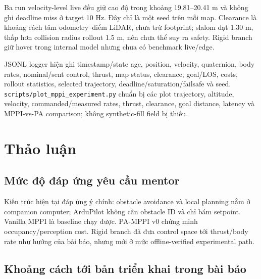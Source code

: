 \documentclass[11pt,a4paper]{article}
\newcommand{\code}[1]{\texttt{#1}}
\begin{document}
Ba run velocity-level live đều giữ cao độ trong khoảng 19.81--20.41 m và không
ghi deadline miss ở target 10 Hz. Đây chỉ là một seed trên mỗi map. Clearance
là khoảng cách tâm odometry--điểm LiDAR, chưa trừ footprint; slalom đạt 1.30 m,
thấp hơn collision radius rollout 1.5 m, nên chưa thể suy ra safety. Rigid
branch giữ hover trong internal model nhưng chưa có benchmark live/edge.

JSONL logger hiện ghi timestamp/state age, position, velocity, quaternion, body
rates, nominal/sent control, thrust, map status, clearance, goal/LOS, costs,
rollout statistics, selected trajectory, deadline/saturation/failsafe và seed.
\code{scripts/plot\_mppi\_experiment.py} chuẩn bị các plot trajectory, altitude,
velocity, commanded/measured rates, thrust, clearance, goal distance, latency và
MPPI-vs-PA comparison; không synthetic-fill field bị thiếu.

\section{Thảo luận}

\subsection{Mức độ đáp ứng yêu cầu mentor}

Kiến trúc hiện tại đáp ứng ý chính: obstacle avoidance và local planning nằm
ở companion computer; ArduPilot không cần obstacle ID và chỉ bám setpoint.
Vanilla MPPI là baseline chạy được. PA-MPPI v0 chứng minh occupancy/perception
cost. Rigid branch đã đưa control space tới thrust/body rate như hướng của bài
báo, nhưng mới ở mức offline-verified experimental path.

\subsection{Khoảng cách tới bản triển khai trong bài báo}
\end{document}
